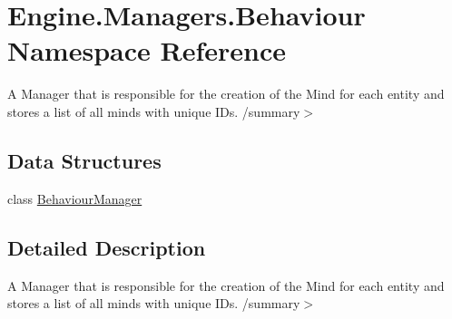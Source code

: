 \hypertarget{a00266}{}\section{Engine.\+Managers.\+Behaviour Namespace Reference}
\label{a00266}


A Manager that is responsible for the creation of the Mind for each entity and stores a list of all minds with unique I\+Ds. /summary$>$  


\subsection*{Data Structures}
\begin{DoxyCompactItemize}
\item 
class \hyperlink{a00486}{Behaviour\+Manager}
\end{DoxyCompactItemize}


\subsection{Detailed Description}
A Manager that is responsible for the creation of the Mind for each entity and stores a list of all minds with unique I\+Ds. /summary$>$ 
